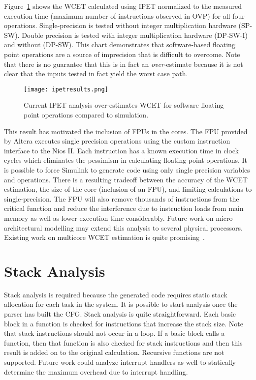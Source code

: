Figure~\ref{f:ipetresults} shows the WCET calculated using IPET normalized to the measured execution time (maximum number of instructions observed in OVP) for all four operations. Single-precision is tested without integer multiplication hardware (SP-SW). Double precision is tested with integer multiplication hardware (DP-SW-I) and without (DP-SW). This chart demonstrates that software-based floating point operations are a source of imprecision that is difficult to overcome. Note that there is no guarantee that this is in fact an \emph{over}-estimate because it is not clear that the inputs tested in fact yield the worst case path.

\begin{figure}[h]
\centering
\texttt{[image: ipetresults.png]}
\caption{Current IPET analysis over-estimates WCET for software floating point operations compared to simulation.}
\label{f:ipetresults}
\end{figure}

This result has motivated the inclusion of FPUs in the cores. The FPU provided by Altera executes single precision operations using the custom instruction interface to the Nios II. Each instruction has a known execution time in clock cycles which eliminates the pessimism in calculating floating point operations. It is possible to force Simulink to generate code using only single precision variables and operations. There is a resulting tradeoff between the accuracy of the WCET estimation, the size of the core (inclusion of an FPU), and limiting calculations to single-precision. The FPU will also remove thousands of instructions from the critical function and reduce the interference due to instruction loads from main memory as well as lower execution time considerably. Future work on micro-architectural modelling may extend this analysis to several physical processors. Existing work on multicore WCET estimation is quite promising~\cite{chattopadhyay2014unified}.

\section{Stack Analysis}
	Stack analysis is required because the generated code requires static stack allocation for each task in the system. 
	It is possible to start analysis once the parser has built the CFG. 
	Stack analysis is quite straightforward. 
	Each basic block in a function is checked for instructions that increase the stack size. 
	Note that stack instructions should not occur in a loop. 
	If a basic block calls a function, then that function is also checked for stack instructions and then this result is added on to the original calculation. 
	Recursive functions are not supported. 
	Future work could analyze interrupt handlers as well to statically determine the maximum overhead due to interrupt handling.


